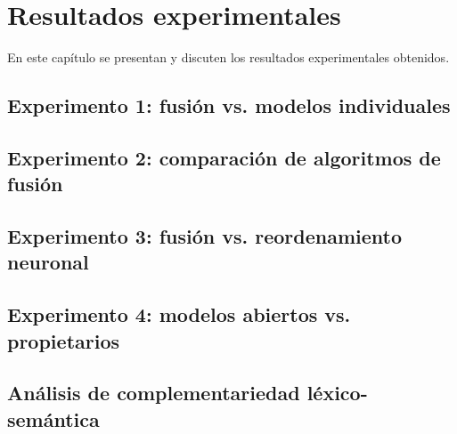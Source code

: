\chapter{Resultados experimentales}\label{cap:resultados}

En este capítulo se presentan y discuten los resultados experimentales obtenidos.

\section{Experimento 1: fusión vs. modelos individuales}\label{sec:resultados-e1}

\section{Experimento 2: comparación de algoritmos de fusión}\label{sec:resultados-e2}

\section{Experimento 3: fusión vs. reordenamiento neuronal}\label{sec:resultados-e3}

\section{Experimento 4: modelos abiertos vs. propietarios}\label{sec:resultados-e4}

\section{Análisis de complementariedad léxico-semántica}\label{sec:resultados-complementariedad}
